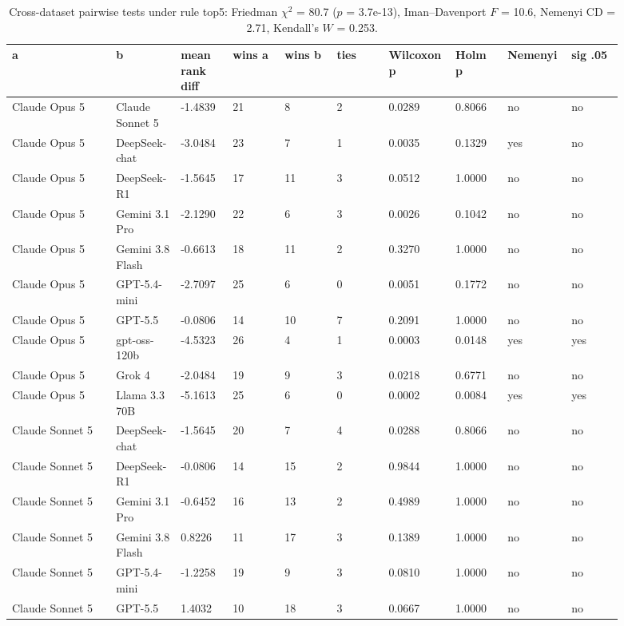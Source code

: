 \begin{landscape}
\tiny
\setlength{\tabcolsep}{3pt}
\begin{longtable}{p{0.162\linewidth}p{0.081\linewidth}p{0.081\linewidth}p{0.081\linewidth}p{0.081\linewidth}p{0.081\linewidth}p{0.081\linewidth}p{0.081\linewidth}p{0.081\linewidth}p{0.081\linewidth}}
\caption{Cross-dataset pairwise tests under rule top5: Friedman $\chi^2$ = 80.7 ($p$ = 3.7e-13), Iman--Davenport $F$ = 10.6, Nemenyi CD = 2.71, Kendall's $W$ = 0.253.}\label{tab:pairwise_top5}\\
\toprule
a & b & mean rank diff & wins a & wins b & ties & Wilcoxon p & Holm p & Nemenyi & sig .05 \\
\midrule
Claude Opus 5 & Claude Sonnet 5 & -1.4839 & 21 & 8 & 2 & 0.0289 & 0.8066 & no & no \\
Claude Opus 5 & DeepSeek-chat & -3.0484 & 23 & 7 & 1 & 0.0035 & 0.1329 & yes & no \\
Claude Opus 5 & DeepSeek-R1 & -1.5645 & 17 & 11 & 3 & 0.0512 & 1.0000 & no & no \\
Claude Opus 5 & Gemini 3.1 Pro & -2.1290 & 22 & 6 & 3 & 0.0026 & 0.1042 & no & no \\
Claude Opus 5 & Gemini 3.8 Flash & -0.6613 & 18 & 11 & 2 & 0.3270 & 1.0000 & no & no \\
Claude Opus 5 & GPT-5.4-mini & -2.7097 & 25 & 6 & 0 & 0.0051 & 0.1772 & no & no \\
Claude Opus 5 & GPT-5.5 & -0.0806 & 14 & 10 & 7 & 0.2091 & 1.0000 & no & no \\
Claude Opus 5 & gpt-oss-120b & -4.5323 & 26 & 4 & 1 & 0.0003 & 0.0148 & yes & yes \\
Claude Opus 5 & Grok 4 & -2.0484 & 19 & 9 & 3 & 0.0218 & 0.6771 & no & no \\
Claude Opus 5 & Llama 3.3 70B & -5.1613 & 25 & 6 & 0 & 0.0002 & 0.0084 & yes & yes \\
Claude Sonnet 5 & DeepSeek-chat & -1.5645 & 20 & 7 & 4 & 0.0288 & 0.8066 & no & no \\
Claude Sonnet 5 & DeepSeek-R1 & -0.0806 & 14 & 15 & 2 & 0.9844 & 1.0000 & no & no \\
Claude Sonnet 5 & Gemini 3.1 Pro & -0.6452 & 16 & 13 & 2 & 0.4989 & 1.0000 & no & no \\
Claude Sonnet 5 & Gemini 3.8 Flash & 0.8226 & 11 & 17 & 3 & 0.1389 & 1.0000 & no & no \\
Claude Sonnet 5 & GPT-5.4-mini & -1.2258 & 19 & 9 & 3 & 0.0810 & 1.0000 & no & no \\
Claude Sonnet 5 & GPT-5.5 & 1.4032 & 10 & 18 & 3 & 0.0667 & 1.0000 & no & no \\

\end{longtable}
\end{landscape}
